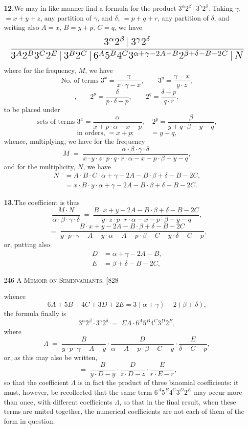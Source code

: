 \documentclass[11pt]{article}
\begin{document}
\medskip
\noindent\textbf{12.}\quad We may in like manner find a formula for the product
$3^{\alpha}2^{\beta}\cdot 3^{\gamma}2^{\delta}$. Taking $\gamma$, $=x+y+z$, any partition
of $\gamma$, and $\delta$, $=p+q+r$, any partition of $\delta$, and writing also
$A=x$, $B=y+p$, $C=q$, we have
\[
\resizebox{\textwidth}{!}{$\displaystyle
\frac{3^{\alpha}2^{\beta}\,|\,3^{\gamma}2^{\delta}}{3^{A}2^{B}3^{C}2^{E}\,|\,3^{B}2^{C}\,|\,6^{A}5^{B}4^{C}3^{\alpha+\gamma-2A-B}2^{\beta+\delta-B-2C}\,|\,N}
$}
\]
where for the frequency, $M$, we have
\[
\text{No.\ of terms } 3^{x} = \frac{\gamma}{x\cdot \gamma-x},\qquad 3^{y} = \frac{\gamma-x}{y\cdot z},
\]
\[
\text{,}\qquad 2^{p} = \frac{\delta}{p\cdot \delta-p},\qquad 2^{q} = \frac{\delta-p}{q\cdot r},
\]
to be placed under
\[
\text{sets of terms } 3^{x} = \frac{\alpha}{x+p\cdot \alpha-x-p},\quad 2^{p} = \frac{\beta}{y+q\cdot \beta-y-q},
\]
\[
\text{in orders,} \;=x+p; \qquad \;=y+q,
\]
whence, multiplying, we have for the frequency
\[
M \;=\; \frac{\alpha\cdot\beta\cdot\gamma\cdot\delta}{x\cdot y\cdot z\cdot p\cdot q\cdot r\cdot \alpha-x-p\cdot \beta-y-q},
\]
and for the multiplicity, $N$, we have
\[
\begin{aligned}
N &= A\cdot B\cdot C\cdot \alpha+\gamma-2A-B\cdot \beta+\delta-B-2C,\\
  &= x\cdot B\cdot y\cdot \alpha+\gamma-2A-B\cdot \beta+\delta-B-2C.
\end{aligned}
\]

\medskip
\noindent\textbf{13.}\quad The coefficient is thus
\[
\frac{M\cdot N}{\alpha\cdot \beta\cdot \gamma\cdot \delta}
\;=\;\frac{B\cdot x+y-2A-B\cdot \beta+\delta-B-2C}{y\cdot z\cdot p\cdot r\cdot \alpha-x-p\cdot \beta-y-q},
\]
\[
\;=\;\frac{B\cdot x+y-2A-B\cdot \beta+\delta-B-2C}{y\cdot p\cdot \gamma-A-y\cdot \alpha-A-p\cdot \beta-C-y\cdot \delta-C-p},
\]
or, putting also
\[
\begin{aligned}
D &= \alpha+\gamma-2A-B,\\
E &= \beta+\delta-B-2C,
\end{aligned}
\]

\newpage
\noindent\textsc{246 \hfill A Memoir on Seminvariants. \hfill [828}
\vspace{0.6em}

\noindent whence
\[
6A+5B+4C+3D+2E = 3(\alpha+\gamma)+2(\beta+\delta),
\]
the formula finally is
\[
3^{\alpha}2^{\beta}\cdot 3^{\gamma}2^{\delta} \;=\; \Sigma\Lambda\cdot 6^{A}5^{B}4^{C}3^{D}2^{E},
\]
where
\[
\Lambda \;=\; \frac{B}{y\cdot p\cdot \gamma-A-y}\cdot \frac{D}{\alpha-A-p\cdot \beta-C-y}\cdot \frac{E}{\delta-C-p},
\]
or, as this may also be written,
\[
\;=\;\frac{B}{y\cdot D-y}\cdot \frac{D}{z\cdot D-z}\cdot \frac{E}{r\cdot E-r},
\]
so that the coefficient $\Lambda$ is in fact the product of three binomial coefficients:
it must, however, be recollected that the same term $6^{A}5^{B}4^{C}3^{D}2^{E}$ may
occur more than once, with different coefficients $\Lambda$, so that in the final result,
when these terms are united together, the numerical coefficients are not each of them
of the form in question.
\end{document}
